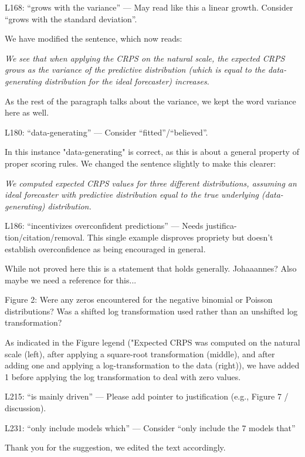 \documentclass{article}
\newcommand{\red}{\color{red}}
\newcommand{\black}{\color{black}}
\newcommand{\blue}{\color{blue}}
\begin{document}
\blue
L168: “grows with the variance” — May read like this a linear growth. Consider “grows with the standard deviation”.

\black
We have modified the sentence, which now reads: 

\textit{We see that when applying the CRPS on the natural scale, the expected CRPS grows as the variance of the predictive distribution (which is equal to the data-generating distribution for the ideal forecaster) increases.}

As the rest of the paragraph talks about the variance, we kept the word variance here as well. 

\blue

L180: “data-generating” — Consider “fitted”/“believed”.

\black
In this instance "data-generating" is correct, as this is about a general property of proper scoring rules. We changed the sentence slightly to make this clearer: 

\textit{We computed expected CRPS values  for three different distributions, assuming an ideal forecaster with predictive distribution equal to the true underlying (data-generating) distribution.}

\red
L186: “incentivizes overconfident predictions” — Needs justifica- tion/citation/removal. This single example disproves propriety but doesn’t establish overconfidence as being encouraged in general.

\black
While not proved here this is a statement that holds generally. Johaaannes? Also maybe we need a reference for this... 

\red
Figure 2: Were any zeros encountered for the negative binomial or Poisson distributions? Was a shifted log transformation used rather than an unshifted log transformation?

\black 
As indicated in the Figure legend ("Expected CRPS was computed on the natural scale (left), after applying a square-root transformation (middle), and after adding one and applying a log-transformation to the data (right)), we have added 1 before applying the log transformation to deal with zero values. 


\red
L215: “is mainly driven” — Please add pointer to justification (e.g., Figure 7 / discussion).

\blue
L231: “only include models which” — Consider “only include the 7 models that”

\black
Thank you for the suggestion, we edited the text accordingly. 
\end{document}
